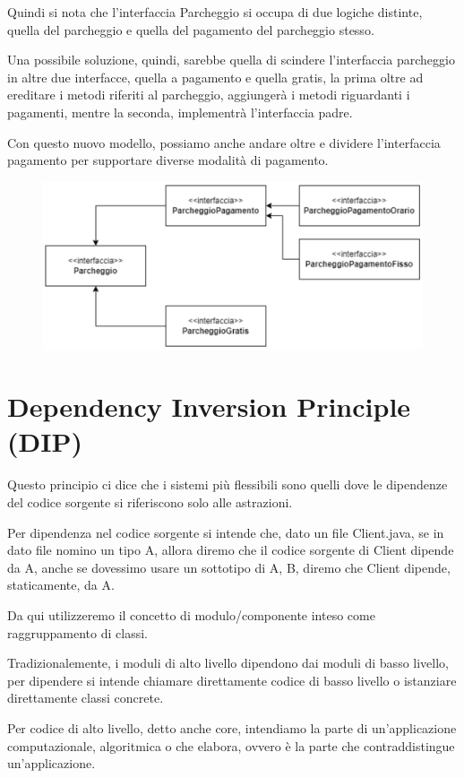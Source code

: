 Quindi si nota che l'interfaccia Parcheggio si occupa di due logiche distinte, quella del parcheggio e quella del pagamento del parcheggio stesso.

Una possibile soluzione, quindi, sarebbe quella di scindere l'interfaccia parcheggio in altre due interfacce, quella a pagamento e quella gratis, la prima oltre 
ad ereditare i metodi riferiti al parcheggio, aggiungerà i metodi riguardanti i pagamenti, mentre la seconda, implementrà l'interfaccia padre.

Con questo nuovo modello, possiamo anche andare oltre e dividere l'interfaccia pagamento per supportare diverse modalità di pagamento.

\begin{figure}[H]
  \centering
  \includegraphics[width=0.5\linewidth]{../../immagini/principio_SOLID/refactoring_interfaccia.png}
\end{figure}

\section{Dependency Inversion Principle (DIP)}

Questo principio ci dice che i sistemi più flessibili sono quelli dove le dipendenze del codice sorgente si riferiscono solo alle astrazioni.

Per dipendenza nel codice sorgente si intende che, dato un file Client.java, se in dato file nomino un tipo A, allora diremo che il codice sorgente di Client dipende 
da A, anche se dovessimo usare un sottotipo di A, B, diremo che Client dipende, staticamente, da A.

Da qui utilizzeremo il concetto di modulo/componente inteso come raggruppamento di classi.

Tradizionalemente, i moduli di alto livello dipendono dai moduli di basso livello, per dipendere si intende chiamare direttamente codice di basso livello o istanziare
direttamente classi concrete.

Per codice di alto livello, detto anche core, intendiamo la parte di un'applicazione computazionale, algoritmica o che elabora, ovvero è la parte che contraddistingue 
un'applicazione.

